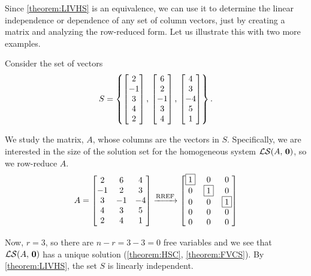 \documentclass{ximera}
\begin{document}
Since \ref{theorem:LIVHS} is an equivalence, we can use it to determine the linear independence or dependence of any set of column vectors, just by creating a matrix and analyzing the row-reduced form.  Let us illustrate this with two more examples.

\begin{example}%
  Consider the set of vectors
  \[
    S=\left\{
      \begin{bmatrix}2\\-1\\3\\4\\2\end{bmatrix},\,
      \begin{bmatrix}6\\2\\-1\\3\\4\end{bmatrix},\,
      \begin{bmatrix}4\\3\\-4\\5\\1\end{bmatrix}
    \right\}.
  \]
  \begin{multipleChoice}
  \end{multipleChoice}

  \begin{explanation}
    We study the matrix, $A$, whose columns are the vectors in $S$.
    Specifically, we are interested in the size of the solution set
    for the homogeneous system $\mathcal{LS}\!\left(A,\,\mathbf{0}\right)$, so we row-reduce $A$.
    \[
      A=
      \begin{bmatrix}
        2 & 6 & 4\\
        -1 & 2 & 3\\
        3 & -1 & -4\\
        4 & 3 & 5\\
        2 & 4 & 1
      \end{bmatrix}
      \xrightarrow{\text{RREF}}
      \begin{bmatrix}
        \fbox{1} & 0 & 0\\
        0 & \fbox{1} & 0\\
        0 & 0 & \fbox{1}\\
        0 & 0 & 0\\
        0 & 0 & 0
      \end{bmatrix}
    \]
    
    Now, $r=3$, so there are $n-r=3-3=0$ free variables and we see
    that $\mathcal{LS}\!\left(A,\,\mathbf{0}\right)$ has a unique solution (\ref{theorem:HSC},
    \ref{theorem:FVCS}).  By \ref{theorem:LIVHS}, the set $S$ is
    linearly independent.
  \end{explanation}
\end{example}
\end{document}
